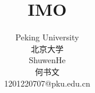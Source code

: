 \documentclass[12pt,twiside,a4paper]{ctexbook}
\numberwithin{chapter}{part}
\begin{document}

\author
{
Peking University\\
北京大学\\
ShuwenHe\\
何书文\\
1201220707@pku.edu.cn
}


\title{IMO}
\maketitle
\tableofcontents %
\newpage
\pagestyle{fancy}
\end{document}
